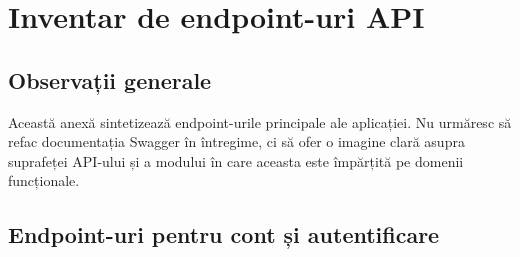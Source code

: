 \chapter{Inventar de endpoint-uri API}

\section{Observații generale}

Această anexă sintetizează endpoint-urile principale ale aplicației. Nu urmăresc să refac documentația Swagger în întregime, ci să ofer o imagine clară asupra suprafeței API-ului și a modului în care aceasta este împărțită pe domenii funcționale.

\section{Endpoint-uri pentru cont și autentificare}

